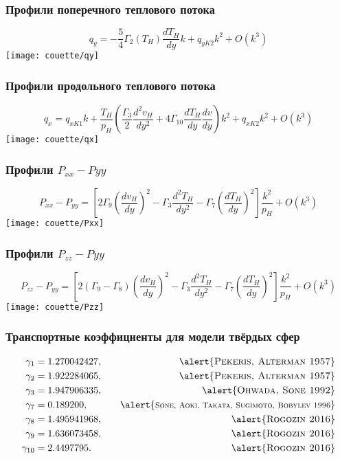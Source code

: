 \documentclass[mathserif]{beamer} %
\newcommand{\dd}{d}%
\newcommand{\der}[2][]{\frac{\dd#1}{\dd#2}}
\newcommand{\derdual}[2][]{\frac{\dd^2#1}{\dd#2^2}}
\newcommand{\OO}[1]{O(#1)}
\newcommand{\Cite}[2][]{\alert{\textsc{#2 #1}}}
\begin{document}
\begin{frame}
    \frametitle{Профили поперечного теплового потока}
    \[ q_y = -\frac54\Gamma_2(T_H)\der[T_H]{y}k + q_{yK2}k^2 + \OO{k^3} \]
    \centering
    \texttt{[image: couette/qy]}
\end{frame}

\begin{frame}
    \frametitle{Профили продольного теплового потока}
    \vspace{-10pt}
    \[ q_x = q_{xK1}k
        + \frac{T_H}{p_H}\left( \frac{\Gamma_3}2 \derdual[v_H]{y}
            + 4\Gamma_{10} \der[T_H]{y}\der[v]{y} \right)k^2
        + q_{xK2}k^2 + \OO{k^3} \]
    \vspace{-10pt}
    \centering
    \texttt{[image: couette/qx]}
\end{frame}

\begin{frame}
    \frametitle{Профили \(P_{xx}-P{yy}\)}
    \vspace{-15pt}
    \[ P_{xx}-P_{yy} = \left[ 2\Gamma_9 \left(\der[v_H]{y}\right)^2
        - \Gamma_3 \derdual[T_H]{y}
        - \Gamma_7\left(\der[T_H]{y}\right)^2 \right]\frac{k^2}{p_H} + \OO{k^3} \]
    \vspace{-15pt}
    \centering
    \texttt{[image: couette/Pxx]}
\end{frame}

\begin{frame}
    \frametitle{Профили \(P_{zz}-P{yy}\)}
    \footnotesize
    \vspace{-15pt}
    \[ P_{zz}-P_{yy} = \left[ 2(\Gamma_9-\Gamma_8) \left(\der[v_H]{y}\right)^2
        - \Gamma_3 \derdual[T_H]{y}
        - \Gamma_7\left(\der[T_H]{y}\right)^2 \right]\frac{k^2}{p_H} + \OO{k^3} \]
    \vspace{-15pt}
    \centering
    \texttt{[image: couette/Pzz]}
\end{frame}

\begin{frame}
    \frametitle{Транспортные коэффициенты для модели твёрдых сфер}
    \begin{alignat*}{2}
        \gamma_1 &= 1.270042427, \quad &\text{\Cite[1957]{Pekeris, Alterman}} \\
        \gamma_2 &= 1.922284065, \quad &\text{\Cite[1957]{Pekeris, Alterman}} \\
        \gamma_3 &= 1.947906335, \quad &\text{\Cite[1992]{Ohwada, Sone}} \\
        \gamma_7 &= 0.189200,    \quad &\text{\Cite[1996]{\footnotesize Sone, Aoki, Takata, Sugimoto, Bobylev}} \\
        \gamma_8 &= 1.495941968, \quad &\text{\Cite[2016]{Rogozin}} \\
        \gamma_9 &= 1.636073458, \quad &\text{\Cite[2016]{Rogozin}} \\
        \gamma_{10} &= 2.4497795.\quad &\text{\Cite[2016]{Rogozin}}
    \end{alignat*}
\end{frame}
\end{document}
